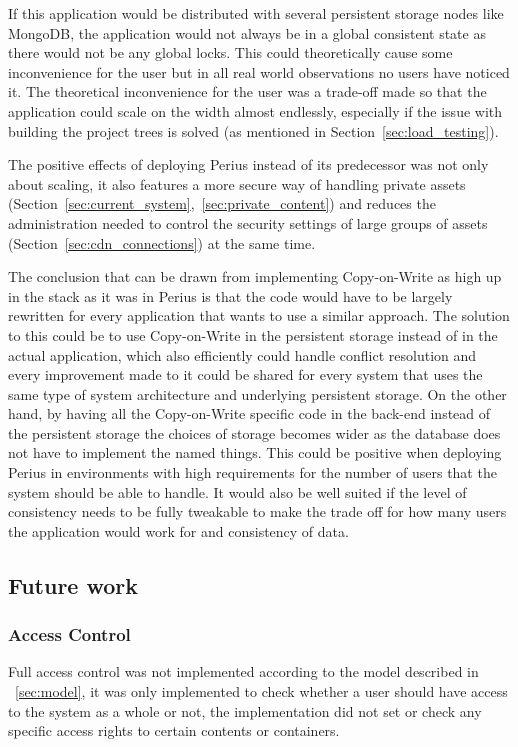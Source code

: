 \documentclass[a4paper,12pt]{article}
\begin{document}
\par If this application would be distributed with several persistent storage nodes like MongoDB,
the application would not always be in a global consistent state as there would not be any global
locks.  This could theoretically cause some inconvenience for the user but in all real world
observations no users have noticed it. The theoretical inconvenience for the user was a trade-off
made so that the application could scale on the width almost endlessly, especially if the issue with
building the project trees is solved (as mentioned in Section~\ref{sec:load_testing}).

\par The positive effects of deploying Perius instead of its predecessor was not only about
scaling, it also features a more secure way of handling private assets 
(Section~\ref{sec:current_system},~\ref{sec:private_content}) and reduces the
administration needed to control the security settings of large groups of assets
(Section~\ref{sec:cdn_connections}) at the same time.

\par The conclusion that can be drawn from implementing Copy-on-Write as high up in the stack as it
was in Perius is that the code would have to be largely rewritten for every application that wants
to use a similar approach. The solution to this could be to use Copy-on-Write in the persistent
storage instead of in the actual application, which also efficiently could handle conflict 
resolution and every improvement made to it could be shared for every system that uses the same 
type of system architecture and underlying persistent storage. On the other hand, by having all the
Copy-on-Write specific code in the back-end instead of the persistent storage the choices of
storage becomes wider as the database does not have to implement the named things. This could be
positive when deploying Perius in environments with high requirements for the number of users
that the system should be able to handle. It would also be well suited if the level of consistency
needs to be fully tweakable to make the trade off for how many users the application would work for
and consistency of data.

\subsection{Future work}
\subsubsection{Access Control}
Full access control was not implemented according to the model described in ~\ref{sec:model}, it
was only implemented to check whether a user should have access to the system as a whole or not, the
implementation did not set or check any specific access rights to certain contents or containers.
\end{document}
